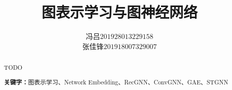 \documentclass{ctexart}
\title{图表示学习与图神经网络}
\author{\begin{tabular}{ll}冯吕 & $201928013229158$\\
	张佳锋 & $201918007329007$
\end{tabular}}
\date{}
\begin{document}

\maketitle
{}
\begin{abstract}

TODO

\centering
\textbf{关键字：}图表示学习、Network Embedding、RecGNN、ConvGNN、GAE、STGNN
\end{abstract}








\newpage

\end{document}
